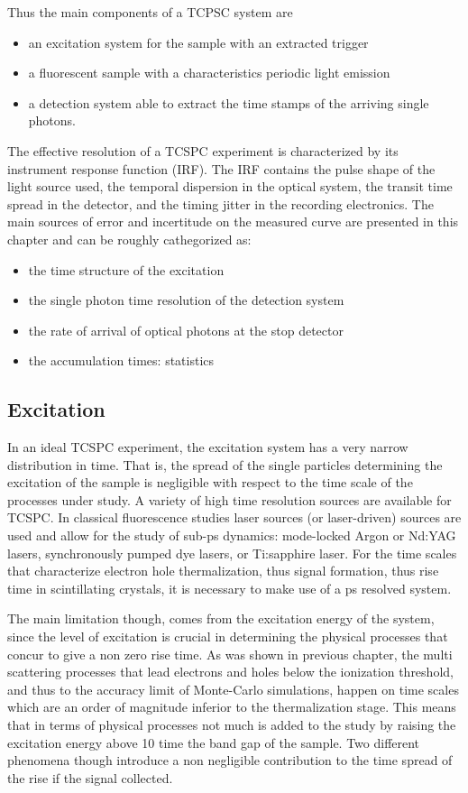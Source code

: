 Thus the main components of a TCPSC system are
\begin{itemize}
\item an excitation system for the sample with an extracted trigger
\item a fluorescent sample with a characteristics periodic light emission
\item a detection system able to extract the time stamps of the arriving single photons.
\end{itemize}
The effective resolution of a TCSPC experiment is characterized by its instrument response function (IRF). The IRF contains the pulse shape of the light source used, the temporal dispersion in the optical system, the transit time spread in the detector, and the timing jitter in the recording electronics.
The main sources of error and incertitude on the measured curve are presented in this chapter and can be roughly cathegorized as:
\begin{itemize}
\item the time structure of the excitation
\item the single photon time resolution of the detection system
\item the rate of arrival of optical photons at the stop detector
\item the accumulation times: statistics
\end{itemize}

\subsection{Excitation}
In an ideal TCSPC experiment, the excitation system has a very narrow distribution in time. That is, the spread of the single particles determining the excitation of the sample is negligible with respect to the time scale of the processes under study.
A variety of high time resolution sources are available for TCSPC. In classical fluorescence studies laser sources (or laser-driven) sources are used and allow for the study of sub-ps dynamics: mode-locked Argon or Nd:YAG lasers, synchronously pumped dye lasers, or Ti:sapphire laser.
For the time scales that characterize electron hole thermalization, thus signal formation, thus rise time in scintillating crystals, it is necessary to make use of a ps resolved system.

The main limitation though, comes from the excitation energy of the system, since the level of excitation is crucial in determining the physical processes that concur to give a non zero rise time. 
As was shown in previous chapter, the multi scattering processes that lead electrons and holes below the ionization threshold, and thus to the accuracy limit of Monte-Carlo simulations, happen on time scales which are an order of magnitude inferior to the thermalization stage. 
This means that in terms of physical processes not much is added to the study by raising the excitation energy above 10 time %
the band gap of the sample.
Two different phenomena though introduce a non negligible contribution to the time spread of the rise if the signal collected.

